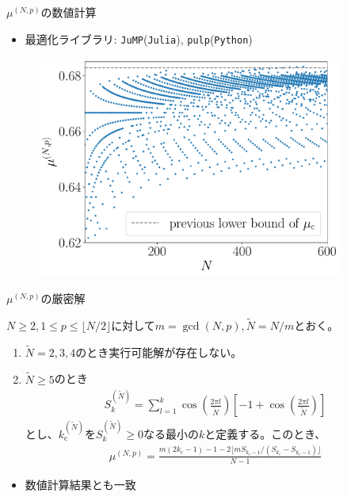 \begin{frame}{$\mu^{(N,p)}$の数値計算}
\begin{itemize}
    \item 最適化ライブラリ: \texttt{JuMP}(\texttt{Julia}), \texttt{pulp}(\texttt{Python})
\end{itemize}
\begin{figure}
    \centering
    \includegraphics[width=0.9\textwidth]{figs/max_connect.pdf}
\end{figure}
\end{frame}

\begin{frame}{$\mu^{(N,p)}$の厳密解}
\begin{theorem}[$\mu^{(N,p)}$]
$N\geq2,1\leq p\leq\lfloor N/2\rfloor$に対して$m=\gcd(N,p),\widetilde{N}=N/m$とおく。
\begin{enumerate}
\item $\widetilde{N}=2,3,4$のとき実行可能解が存在しない。%
\item $\widetilde{N}\geq 5$のとき
\begin{align*}
    S_{k}^{(\widetilde{N})}=\sum_{l=1}^{k}\cos\left(\frac{2\pi l}{\widetilde{N}}\right)\left[-1+\cos\left(\frac{2\pi l}{\widetilde{N}}\right)\right]
\end{align*}
とし、$k_{\mathrm{c}}^{(\widetilde{N})}$を$S_{k}^{(\widetilde{N})}\geq0$なる最小の$k$と定義する。このとき、
\begin{align*}
    \mu^{(N,p)}=\frac{m(2k_{\mathrm{c}}-1)-1-2\lfloor mS_{k_{\mathrm{c}}-1}/(S_{k_{\mathrm{c}}}-S_{k_{\mathrm{c}}-1})\rfloor}{N-1}
\end{align*}
\end{enumerate}
\end{theorem}

\begin{itemize}
    \item 数値計算結果とも一致
\end{itemize}

\end{frame}

